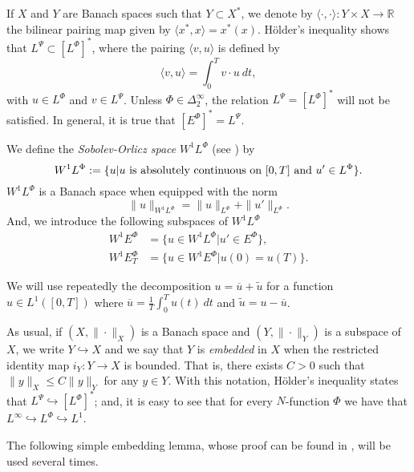 \documentclass[twoside]{elsarticle}
\theoremstyle{remark}
\newcommand{\orlnor}{\|_{L^{\Phi}}}
\newcommand{\lphi}{L^{\Phi}}
\newcommand{\lpsi}{L^{\Psi}}
\newcommand{\ephi}{E^{\Phi}}
\newcommand{\wphi}{W^{1}\lphi}
\newcommand{\wphie}{W^{1}\ephi}
\renewcommand{\leq}{\leqslant}
\begin{document}
If $X$ and $Y$ are  Banach spaces such that  $Y\subset X^*$, we denote by $\langle\cdot,\cdot\rangle:Y\times X\to\mathbb{R}$ the bilinear pairing  map given by $\langle x^*,x\rangle=x^*(x)$. H\"older's inequality shows that $\lpsi\subset \left[\lphi\right]^*$, where the pairing
$\langle v, u\rangle$
is defined by 
\begin{equation}\label{pairing}
  \langle v,u\rangle=\int_0^Tv\cdot u\ dt,
\end{equation}
with  $u\in\lphi$ and $v\in\lpsi$.
 Unless $\Phi \in \Delta_2^{\infty}$, the relation $\lpsi= \left[\lphi\right]^*$ will not be satisfied. 
In general, it is true  that  $\left[\ephi\right]^*=\lpsi$.



We define the \emph{Sobolev-Orlicz space} $\wphi$ (see \cite{adams_sobolev}) by
\[\wphi:=\{u| u \hbox{ is absolutely continuous on $[0,T]$ and } u'\in \lphi\}.\]
$\wphi$ is a Banach space when equipped with the norm
\begin{equation}\label{def-norma-orlicz-sob}
\|  u  \|_{\wphi}= \|  u  \|_{\lphi} + \|u'\orlnor.
\end{equation}
And, we introduce the following subspaces of $\wphi$
\begin{equation}\label{def-esp-orlicz-sob-per}
\begin{split}
\wphie&=\{u\in\wphi|u'\in\ephi\},\\
\wphie_T&=\{u\in\wphie|u(0)=u(T)\}.
\end{split}
\end{equation}



We will use repeatedly the decomposition $u=\overline{u}+\widetilde{u}$ for a function $u\in L^1([0,T])$  where $\overline{u} =\frac1T\int_0^T u(t)\ dt$ and $\widetilde{u}=u-\overline{u}$.

As usual, if $(X,\|\cdot\|_X)$ is a Banach space and $(Y,\|\cdot \|_Y)$ is a subspace of $X$,  we write $Y\hookrightarrow X$ and we say that $Y$ is \emph{embedded} in $X$  when the restricted identity map $i_Y:Y\to X$ is bounded. That is, there exists $C>0$ such that  
$\|y\|_X\leq C\|y\|_Y$ for any $y\in Y$.  With this notation, H\"older's inequality states that  $\lpsi\hookrightarrow  \left[\lphi\right]^*$; and, it is easy to see that for every $N$-function $\Phi$ we have that $L^{\infty}\hookrightarrow\lphi \hookrightarrow L^1$.




The following simple  embedding lemma, whose proof can be found in \cite{ABGMS2015}, will be used several times.
\end{document}
